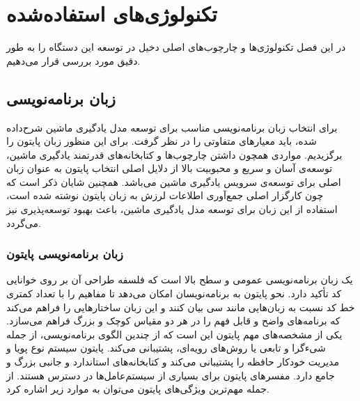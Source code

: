 \chapter{تکنولوژی‌های استفاده‌شده}

در این فصل تکنولوژی‌ها و چارچوب‌های اصلی دخیل در توسعه این دستگاه را به طور دقیق مورد بررسی قرار می‌دهیم.

\section{‌‌زبان برنامه‌نویسی}
برای انتخاب زبان برنامه‌نویسی مناسب برای توسعه مدل یادگیری ماشین شرح‌داده شده، باید معیارهای متفاوتی را در نظر گرفت. برای این منظور زبان پایتون را برگزیدیم. مواردی همچون داشتن چارچوب‌ها و کتابخانه‌های قدرتمند یادگیری ماشین، توسعه‌ی آسان و سریع و محبوبیت بالا از دلایل اصلی انتخاب پایتون به عنوان زبان اصلی برای توسعه‌ی سرویس یادگیری ماشین می‌باشد. همچنین شایان ذکر است که چون کارگزار اصلی جمع‌آوری اطلاعات لرزش به زبان پایتون نوشته شده است، استفاده از این زبان برای توسعه مدل یادگیری ماشین، باعث بهبود توسعه‌پذیری نیز می‌گردد. 

\subsection{زبان برنامه‌نویسی پایتون}
یک زبان برنامه‌نویسی عمومی و سطح بالا است که فلسفه طراحی آن بر روی خوانایی کد تأکید دارد. نحو پایتون به برنامه‌نویسان امکان می‌دهد تا مفاهیم را با تعداد کمتری خط کد نسبت به زبان‌هایی مانند سی بیان کنند و این زبان ساختارهایی را فراهم می‌کند که برنامه‌های واضح و قابل فهم را در هر دو مقیاس کوچک و بزرگ فراهم می‌سازد\cite{van2007python}. یکی از مشخصه‌های مهم پایتون این است که از چندین الگوی برنامه‌نویسی، از جمله شیءگرا و تابعی یا روش‌های رویه‌ای، پشتیبانی می‌کند. پایتون سیستم نوع پویا و مدیریت خودکار حافظه را پشتیبانی می‌کند و کتابخانه‌های استاندارد و جانبی بزرگ و جامع دارد. مفسرهای پایتون برای بسیاری از سیستم‌عامل‌ها در دسترس هستند\cite{srinath2017python}. از جمله مهم‌ترین ویژگی‌های پایتون می‌توان به موارد زیر اشاره کرد.

